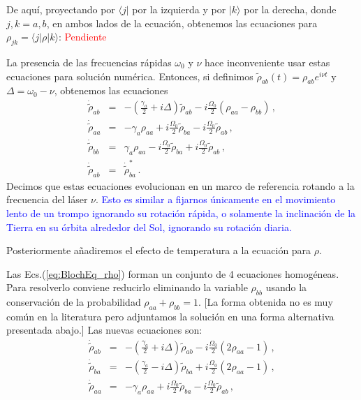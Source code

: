 \documentclass[twocolumn,aps,eqsecnum]{revtex4}
\providecommand{\bra}[1]{\langle #1 \rvert}
\providecommand{\ket}[1]{\lvert #1 \rangle}
\begin{document}
De aqu\'i, proyectando por $\bra{j}$ por la izquierda y por $\ket{k}$ por la 
derecha, donde $j,k =a,b$, en ambos lados de la ecuaci\'on, obtenemos las ecuaciones para $\rho_{jk} = \bra{j} \rho \ket{k}$: 
\newline \textcolor{red}{Pendiente}

La presencia de las frecuencias r\'apidas $\omega_0$ y $\nu$ hace 
inconveniente usar estas ecuaciones para soluci\'on num\'erica. Entonces, 
si definimos $\tilde{\rho}_{ab}(t) = \rho_{ab} e^{i\nu t}$ y 
$\Delta = \omega_0 -\nu$, obtenemos las ecuaciones
%
\begin{eqnarray} 	\label{eq:BlochEq_rho}
\dot{\tilde{\rho}}_{ab} 
	&=& - \left( \frac{\gamma_a}{2} +i\Delta \right) \tilde{\rho}_{ab}
	-i\frac{\Omega_0}{2} (\rho_{aa} -\rho_{bb}) 	\,, \nonumber \\ 
\dot{\tilde{\rho}}_{aa} 
	&=& -\gamma_a \rho_{aa} + i\frac{\Omega_0}{2} \tilde{\rho}_{ba} 
	- i\frac{\Omega_0}{2} \tilde{\rho}_{ab} 	\,, 	\nonumber \\ 
\dot{\tilde{\rho}}_{bb} 
	&=& \gamma_a \rho_{aa} - i\frac{\Omega_0}{2} \tilde{\rho}_{ba} 
	+ i\frac{\Omega_0}{2} \tilde{\rho}_{ab} 	\,, 	\\ 
\dot{\tilde{\rho}}_{ab} 
	&=& 	 \dot{\tilde{\rho}}_{ba}^\ast  \,. \nonumber
\end{eqnarray}
Decimos que estas ecuaciones evolucionan en un marco de referencia 
rotando a la frecuencia del l\'aser $\nu$. \textcolor{blue}{Esto es similar a 
fijarnos \'unicamente en el movimiento lento de un trompo ignorando su 
rotaci\'on r\'apida, o solamente la inclinaci\'on de la Tierra en su \'orbita 
alrededor del Sol, ignorando su rotaci\'on diaria.  }

Posteriormente a\~nadiremos el efecto de temperatura a la ecuaci\'on 
para $\rho$. 

Las Ecs.(\ref{eq:BlochEq_rho}) forman un conjunto de 4 ecuaciones 
homog\'eneas. Para resolverlo conviene reducirlo eliminando la variable 
$\rho_{bb}$  usando la conservaci\'on de la probabilidad 
$\rho_{aa} +\rho_{bb} =1$. [La forma obtenida no es muy com\'un en la 
literatura pero adjuntamos la soluci\'on en una forma alternativa 
presentada abajo.] Las nuevas ecuaciones son: 
%
\begin{eqnarray} 	\label{eq:BlochEq_rhoV2}
\dot{\tilde{\rho}}_{ab} 
	&=& - \left( \frac{\gamma_a}{2} +i\Delta \right) \tilde{\rho}_{ab}
	-i\frac{\Omega_0}{2} (2\rho_{aa} -1) 	\,, \nonumber \\ 
\dot{\tilde{\rho}}_{ba} 
	&=& - \left( \frac{\gamma_a}{2} -i\Delta \right) \tilde{\rho}_{ba}
	+i\frac{\Omega_0}{2} (2\rho_{aa} -1) 	\,, \nonumber \\ 
\dot{\tilde{\rho}}_{aa} 
	&=& -\gamma_a \rho_{aa} + i\frac{\Omega_0}{2} \tilde{\rho}_{ba} 
	- i\frac{\Omega_0}{2} \tilde{\rho}_{ab} 	\,, 	
\end{eqnarray}
\end{document}
